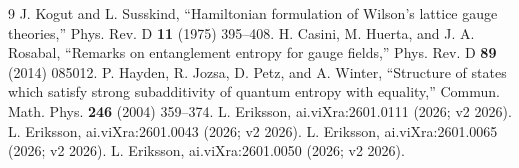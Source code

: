 \documentclass[11pt]{article}
\theoremstyle{remark}
\begin{document}
\begin{thebibliography}{9}
 J. Kogut and L. Susskind, ``Hamiltonian formulation of
Wilson's lattice gauge theories,'' Phys. Rev. D \textbf{11} (1975)
395--408.
 H. Casini, M. Huerta, and J. A. Rosabal, ``Remarks on
entanglement entropy for gauge fields,'' Phys. Rev. D \textbf{89} (2014)
085012.
 P. Hayden, R. Jozsa, D. Petz, and A. Winter, ``Structure
of states which satisfy strong subadditivity of quantum entropy with
equality,'' Commun. Math. Phys. \textbf{246} (2004) 359--374.
 L. Eriksson, ai.viXra:2601.0111 (2026; v2 2026).
 L. Eriksson, ai.viXra:2601.0043 (2026; v2 2026).
 L. Eriksson, ai.viXra:2601.0065 (2026; v2 2026).
 L. Eriksson, ai.viXra:2601.0050 (2026; v2 2026).
\end{thebibliography}
\end{document}
